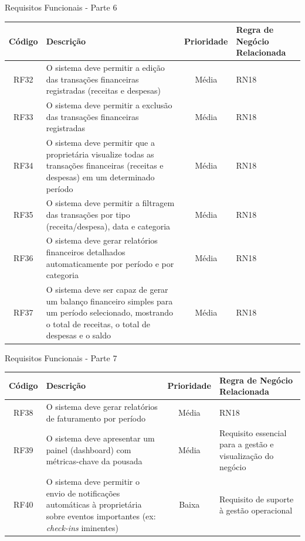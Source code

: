 \documentclass[
	12pt,				%
	openany,			%
	twoside,			%
	a4paper,			%
	english,			%
	french,				%
	spanish,			%
	brazil				%
	]{abntex2}
\begin{document}
\begin{quadro}[H]
	\caption{Requisitos Funcionais - Parte 6}
	\label{quadro_rf6}
	\begin{tabular}{|c|p{5cm}|c|p{4cm}|}
		\hline
		\textbf{Código} & \textbf{Descrição} & \textbf{Prioridade} & \textbf{Regra de Negócio Relacionada} \\ \hline
		RF32 & O sistema deve permitir a edição das transações financeiras registradas (receitas e despesas) & Média & RN18 \\ \hline
		RF33 & O sistema deve permitir a exclusão das transações financeiras registradas & Média & RN18 \\ \hline
		RF34 & O sistema deve permitir que a proprietária visualize todas as transações financeiras (receitas e despesas) em um determinado período & Média & RN18 \\ \hline
		RF35 & O sistema deve permitir a filtragem das transações por tipo (receita/despesa), data e categoria & Média & RN18 \\ \hline
		RF36 & O sistema deve gerar relatórios financeiros detalhados automaticamente por período e por categoria & Média & RN18 \\ \hline
		RF37 & O sistema deve ser capaz de gerar um balanço financeiro simples para um período selecionado, mostrando o total de receitas, o total de despesas e o saldo & Média & RN18 \\ \hline
	\end{tabular}

\end{quadro}
\begin{quadro}[H]
	\caption{Requisitos Funcionais - Parte 7}
	\label{quadro_rf7}
	\begin{tabular}{|c|p{5cm}|c|p{4cm}|}
		\hline
		\textbf{Código} & \textbf{Descrição} & \textbf{Prioridade} & \textbf{Regra de Negócio Relacionada} \\ \hline
		RF38 & O sistema deve gerar relatórios de faturamento por período & Média & RN18 \\ \hline
		RF39 & O sistema deve apresentar um painel (dashboard) com métricas-chave da pousada & Média & Requisito essencial para a gestão e visualização do negócio \\ \hline
		RF40 & O sistema deve permitir o envio de notificações automáticas à proprietária sobre eventos importantes (ex: \textit{check-ins} iminentes)
		 & Baixa & Requisito de suporte à gestão operacional \\ \hline
		\end{tabular}
	
\end{quadro}
\end{document}
